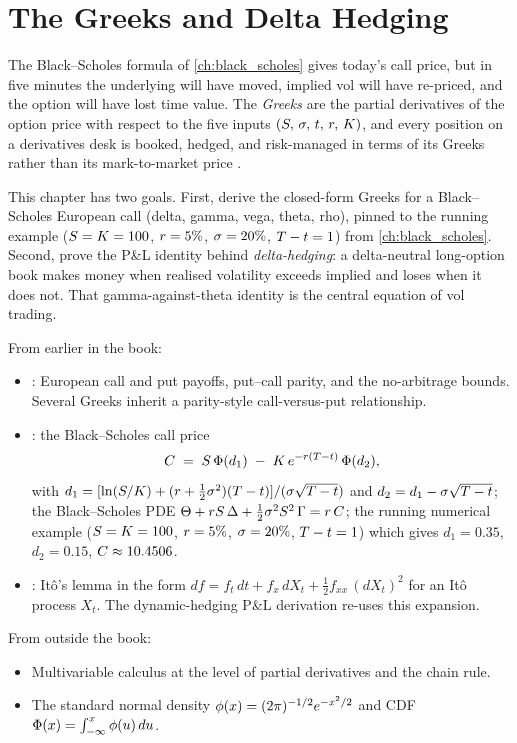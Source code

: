 \chapter{The Greeks and Delta Hedging}
\label{ch:greeks_hedging}

The Black--Scholes formula of \cref{ch:black_scholes} gives today's
call price, but in five minutes the underlying will have moved,
implied vol will have re-priced, and the option will have lost time
value. The \emph{Greeks} are the partial derivatives of the option
price with respect to the five inputs
$(S,\,\sigma,\,t,\,r,\,K)$, and every position on a
derivatives desk is booked, hedged, and risk-managed in terms of
its Greeks rather than its mark-to-market price \citeNatenberg.

This chapter has two goals. First, derive the closed-form Greeks
for a Black--Scholes European call (delta, gamma, vega, theta,
rho), pinned to the running example ($S = K = 100$,
$r = 5\%$, $\sigma = 20\%$, $T - t = 1$) from
\cref{ch:black_scholes}. Second, prove the P\&L identity behind
\emph{delta-hedging}: a delta-neutral long-option book makes money
when realised volatility exceeds implied and loses when it does
not. That gamma-against-theta identity is the central equation of
vol trading.

\begin{backgroundbox}[Prerequisites]
From earlier in the book:
\begin{itemize}
  \item {}: European call and put payoffs,
  put--call parity, and the no-arbitrage bounds. Several Greeks
  inherit a parity-style call-versus-put relationship.
  \item {}: the Black--Scholes call price
  \begin{equation*}
    C \;=\; S\,\Phi(d_1) \;-\; K\,e^{-r(T-t)}\,\Phi(d_2),
  \end{equation*}
  with $d_1 = [\ln(S/K) + (r + \tfrac12 \sigma^2)(T - t)]
  /(\sigma\sqrt{T - t})$ and $d_2 = d_1 - \sigma\sqrt{T - t}$;
  the Black--Scholes PDE
  $\Theta + r S\,\Delta + \tfrac12 \sigma^2 S^2\,\Gamma = r\,C$;
  the running numerical example ($S = K = 100$, $r =
  5\%$, $\sigma = 20\%$, $T - t = 1$) which gives $d_1 = 0.35$,
  $d_2 = 0.15$, $C \approx 10.4506$.
  \item {}: It\^o's lemma in the form
  $df = f_t\,dt + f_x\,dX_t + \tfrac12 f_{xx}\,(dX_t)^2$ for an
  It\^o process $X_t$. The dynamic-hedging P\&L derivation re-uses
  this expansion.
\end{itemize}
From outside the book:
\begin{itemize}
  \item Multivariable calculus at the level of partial derivatives
  and the chain rule.
  \item The standard normal density $\phi(x) = (2\pi)^{-1/2}
  e^{-x^2/2}$ and CDF $\Phi(x) = \int_{-\infty}^x \phi(u)\,du$.
\end{itemize}
\end{backgroundbox}

